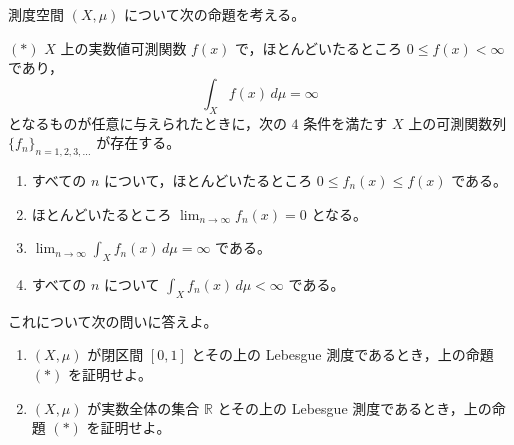 \newcommand{\C}{\mathbb{C}}
\newcommand{\R}{\mathbb{R}}
\newcommand{\Z}{\mathbb{Z}}
\newcommand{\Tr}{\operatorname{Tr}}
\newcommand{\Impart}{\operatorname{Im}}
\newcommand{\AF}{\operatorname{AF}}
\newcommand{\AX}{\operatorname{AX}}
\newcommand{\GL}{\operatorname{GL}}


測度空間 \((X,\mu)\) について次の命題を考える。

\((*)\) \(X\) 上の実数値可測関数 \(f(x)\) で，ほとんどいたるところ \(0\le f(x)<\infty\) であり，
\[
  \int_X f(x)\,d\mu=\infty
\]
となるものが任意に与えられたときに，次の \(4\) 条件を満たす \(X\) 上の可測関数列
\(\{f_n\}_{n=1,2,3,\ldots}\) が存在する。

\begin{enumerate}
  \item[(a)] すべての \(n\) について，ほとんどいたるところ \(0\le f_n(x)\le f(x)\) である。
  \item[(b)] ほとんどいたるところ \(\lim_{n\to\infty}f_n(x)=0\) となる。
  \item[(c)] \(\displaystyle \lim_{n\to\infty}\int_X f_n(x)\,d\mu=\infty\) である。
  \item[(d)] すべての \(n\) について \(\displaystyle \int_X f_n(x)\,d\mu<\infty\) である。
\end{enumerate}

これについて次の問いに答えよ。

\begin{enumerate}
  \item \((X,\mu)\) が閉区間 \([0,1]\) とその上の Lebesgue 測度であるとき，上の命題 \((*)\) を証明せよ。
  \item \((X,\mu)\) が実数全体の集合 \(\R\) とその上の Lebesgue 測度であるとき，上の命題 \((*)\) を証明せよ。
\end{enumerate}

%